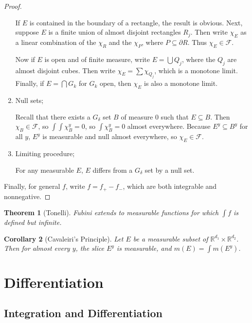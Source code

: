 \documentclass[leqno, openany]{memoir}
\newtheorem{thm}{Theorem}[chapter]
\newtheorem{cor}[thm]{Corollary}
\theoremstyle{definition}
\theoremstyle{remark}
\theoremstyle{plain}
\theoremstyle{definition}
\theoremstyle{remark}
\newcommand{\R}{\mathbb{R}}
\newcommand{\mc}[1]{\mathcal{#1}}
\begin{document}
\begin{proof}
\begin{enumerate}
            If $E$ is contained in the boundary of a rectangle, the result is
            obvious. Next, suppose $E$ is a finite union of almost disjoint
            rectangles $R_j$. Then write $\chi_E$ as a linear combination of
            the $\chi_R$ and the $\chi_P$, where $P \subseteq \partial R$. Thus
            $\chi_E \in \mc{F}$.

            Now if $E$ is open and of finite measure, write $E = \bigcup Q_j$,
            where the $Q_j$ are almost disjoint cubes. Then write $\chi_E =
            \sum \chi_{Q_j}$, which is a monotone limit. Finally, if $E =
            \bigcap G_k$ for $G_k$ open, then $\chi_E$ is also a monotone
            limit.  \item Null sets;

            Recall that there exists a $G_{\delta}$ set $B$ of measure $0$ such
            that $E \subseteq B$. Then $\chi_B \in \mc{F}$, so $\int \int
            \chi_B^y = 0$, so $\int \chi_B^y = 0$ almost everywhere. Because
            $E^y \subseteq B^y$ for all $y$, $E^y$ is measurable and null
            almost everywhere, so $\chi_E \in \mc{F}$.  \item Limiting
            procedure;

            For any measurable $E$, $E$ differs from a $G_{\delta}$ set by a
    null set.  \end{enumerate} Finally, for general $f$, write $f = f_+ - f_-$,
which are both integrable and nonnegative.  \end{proof}

\begin{thm}[Tonelli] Fubini extends to measurable functions for which $\int f$
is defined but infinite.  \end{thm}

\begin{cor}[Cavaleiri's Principle] Let $E$ be a measurable subset of $\R^{d_1}
\times \R^{d_2}$. Then for almost every $y$, the slice $E^y$ is measurable, and
$m(E) = \int m(E^y)$.  \end{cor}

\chapter{Differentiation}%

\section{Integration and Differentiation}%
\label{sec:integration_and_differentiation}
\end{document}
